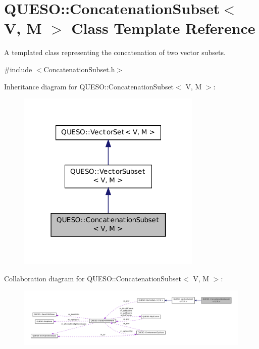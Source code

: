 \hypertarget{class_q_u_e_s_o_1_1_concatenation_subset}{\section{Q\-U\-E\-S\-O\-:\-:Concatenation\-Subset$<$ V, M $>$ Class Template Reference}
\label{class_q_u_e_s_o_1_1_concatenation_subset}
}


A templated class representing the concatenation of two vector subsets.  




{\ttfamily \#include $<$Concatenation\-Subset.\-h$>$}



Inheritance diagram for Q\-U\-E\-S\-O\-:\-:Concatenation\-Subset$<$ V, M $>$\-:
\nopagebreak
\begin{figure}[H]
\begin{center}
\leavevmode
\includegraphics[width=250pt]{class_q_u_e_s_o_1_1_concatenation_subset__inherit__graph}
\end{center}
\end{figure}


Collaboration diagram for Q\-U\-E\-S\-O\-:\-:Concatenation\-Subset$<$ V, M $>$\-:
\nopagebreak
\begin{figure}[H]
\begin{center}
\leavevmode
\includegraphics[width=350pt]{class_q_u_e_s_o_1_1_concatenation_subset__coll__graph}
\end{center}
\end{figure}
